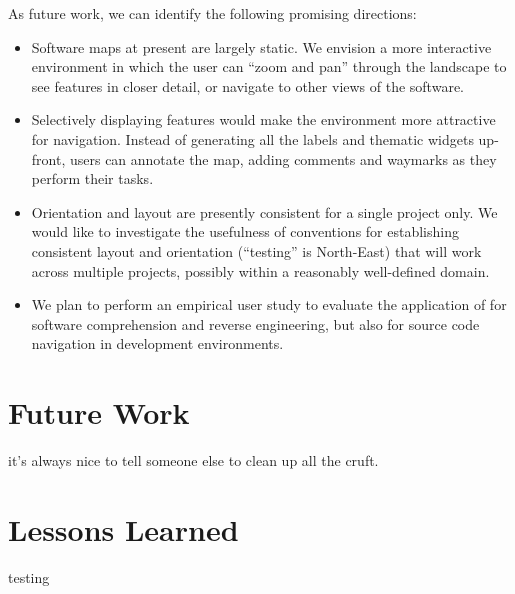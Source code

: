 As future work, we can identify the following promising directions:
\begin{itemize}
  \item Software maps at present are largely static.
  We envision a more interactive environment in which the user can ``zoom and pan'' through the landscape to see features in closer detail, or navigate to other views of the software.
  \item Selectively displaying features would make the environment more attractive for navigation. Instead of generating all the labels and thematic widgets up-front, users can annotate the map, adding comments and waymarks as they perform their tasks.
  \item Orientation and layout are presently consistent for a single project only.
  We would like to investigate the usefulness of conventions for establishing consistent layout and orientation (\ie ``testing'' is North-East) that will work across multiple projects, possibly within a reasonably well-defined domain.
  \item We plan to perform an empirical user study to evaluate the application of \SOCA for software comprehension and reverse engineering, but also for source code navigation in development environments.
\end{itemize}


\section{Future Work}
it's always nice to tell someone else to clean up all the cruft.

\section{Lessons Learned}

testing